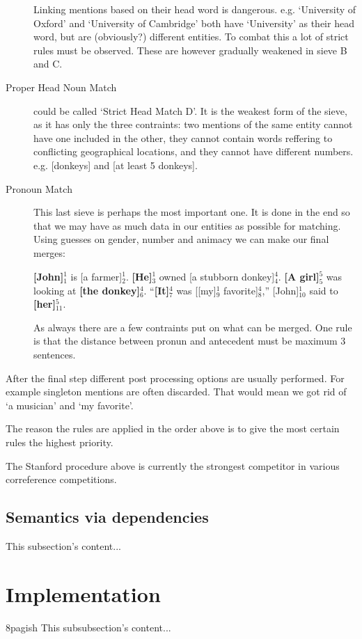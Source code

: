 \documentclass[12pt]{article}
\let\stdsection\section
\renewcommand\section{\newpage\stdsection}
\begin{document}
\begin{description}
Linking mentions based on their head word is dangerous. e.g. `University of Oxford' and `University of Cambridge' both have `University' as their head word, but are (obviously?) different entities. To combat this a lot of strict rules must be observed. These are however gradually weakened in sieve B and C.
\item[Proper Head Noun Match] could be called `Strict Head Match D'. It is the weakest form of the sieve, as it has only the three contraints: two mentions of the same entity cannot have one included in the other, they cannot contain words reffering to conflicting geographical locations, and they cannot have different numbers. e.g. [donkeys] and [at least 5 donkeys].
\item[Pronoun Match]
This last sieve is perhaps the most important one. It is done in the end so that we may have as much data in our entities as possible for matching. Using guesses on gender, number and animacy we can make our final merges:

\textbf{[John]$_1^1$} is [a farmer]$_2^1$. \textbf{[He]$_3^1$} owned [a stubborn donkey]$_4^4$.\newline
\textbf{[A girl]$_5^5$} was looking at \textbf{[the donkey]$_6^4$}.\newline
``\textbf{[It]$_7^4$} was [[my]$_9^1$ favorite]$_8^4$,'' [John]$_{10}^1$ said to \textbf{[her]$_{11}^{5}$}.

As always there are a few contraints put on what can be merged. One rule is that the distance between pronun and antecedent must be maximum 3 sentences.
\end{description}

After the final step different post processing options are usually performed. For example singleton mentions are often discarded. That would mean we got rid of `a musician' and `my favorite'.

The reason the rules are applied in the order above is to give the most certain rules the highest priority.

The Stanford procedure above is currently the strongest competitor in various correference competitions.

\subsection{Semantics via dependencies}
This subsection's content...

\section{Implementation}
8pagish
This subsubsection's content...
\end{document}
